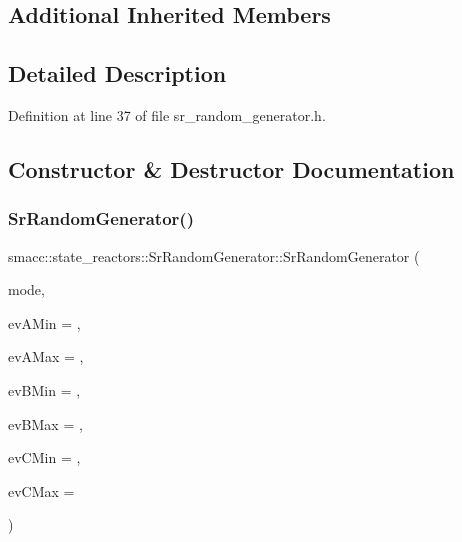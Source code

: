 \subsection*{Additional Inherited Members}


\subsection{Detailed Description}


Definition at line 37 of file sr\+\_\+random\+\_\+generator.\+h.



\subsection{Constructor \& Destructor Documentation}
\mbox{\label{classsmacc_1_1state__reactors_1_1SrRandomGenerator_a3aef4d193f072566e2372a2497f2ea5b}} 
\subsubsection{\texorpdfstring{Sr\+Random\+Generator()}{SrRandomGenerator()}}
{\footnotesize\ttfamily smacc\+::state\+\_\+reactors\+::\+Sr\+Random\+Generator\+::\+Sr\+Random\+Generator (\begin{DoxyParamCaption}\item[{\hyperlink{namespacesmacc_1_1state__reactors_a038f8e362ad6d35494c940ee4c97a52e}{Random\+Generate\+Reactor\+Mode}}]{mode,  }\item[{double}]{ev\+A\+Min = {},  }\item[{double}]{ev\+A\+Max = {},  }\item[{double}]{ev\+B\+Min = {},  }\item[{double}]{ev\+B\+Max = {},  }\item[{double}]{ev\+C\+Min = {},  }\item[{double}]{ev\+C\+Max = {} }\end{DoxyParamCaption})}



